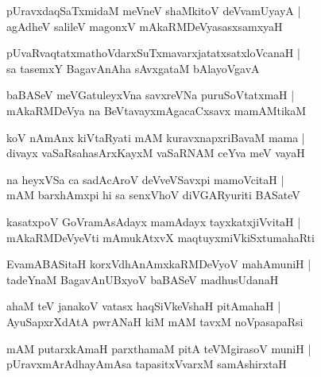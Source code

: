 \begin{shloka}
pUravxdaqSaTxmidaM meVneV shaMkitoV deVvamUyayA |\\
agAdheV salileV magonxV mAkaRMDeVyasasxsamxyaH 
\end{shloka}

\begin{shloka}
pUvaRvaqtatxmathoVdarxSuTxmavarxjatatxsatxloVcanaH |\\
sa tasemxY BagavAnAha sAvxgataM bAlayoVgavA\R
\end{shloka}

\begin{shloka}
baBASeV meVGatuleyxVna savxreVNa puruSoVtatxmaH |\\
mAkaRMDeVya na BeVtavayxmAgacaCxsavx mamAMtikaM 
\end{shloka}

\begin{shloka}
koV nAmAnx kiVtaRyati mAM kuravxnapxriBavaM mama |\\
divayx vaSaRsahasArxKayxM vaSaRNAM ceYva meV vayaH 
\end{shloka}

\begin{shloka}
na heyxVSa ca sadAcAroV deVveVSavxpi mamoVcitaH |\\
mAM barxhAmxpi hi sa senxVhoV diVGARyuriti BASateV 
\end{shloka}

\begin{shloka}
kasatxpoV GoVramAsAdayx mamAdayx tayxkatxjiVvitaH |\\
mAkaRMDeVyeVti mAmukAtxvX maqtuyxmiVkiSxtumahaRti
\end{shloka}

\begin{shloka}
EvamABASitaH korxVdhAnAmxkaRMDeVyoV mahAmuniH |\\
tadeYnaM BagavAnUBxyoV baBASeV madhusUdanaH 
\end{shloka}

\begin{shloka}
ahaM teV janakoV vatasx haqSiVkeVshaH pitAmahaH |\\
AyuSapxrXdAtA pwrANaH kiM mAM tavxM noVpasapaRsi 
\end{shloka}

\begin{shloka}
mAM putarxkAmaH parxthamaM pitA teVMgirasoV muniH |\\
pUravxmArAdhayAmAsa tapasitxVvarxM samAshirxtaH 
\end{shloka}

